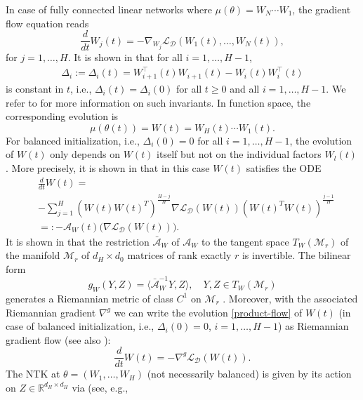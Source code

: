 \documentclass[twoside]{article}
\theoremstyle{definition}
\theoremstyle{remark}
\begin{document}
In  case of fully connected linear networks where $\mu(\theta) = W_N\cdots W_1$, the gradient flow equation reads
\begin{equation}\label{grad-flow-fully-connected}
\frac{d}{dt} W_j(t) = - \nabla_{W_j} \mathcal{L}_{\mathcal{D}}(W_1(t),\hdots,W_N(t)), 
\end{equation}
for $ j=1,\hdots,H$. It is shown in \cite{arora2018optimization} that  for all $i = 1, \ldots, H-1$,
\begin{align}
\label{eq:balancedFullyConnected}
   \Delta_i := \Delta_i(t) = W_{i+1}^\top(t) W_{i+1}(t) - W_{i}(t)W_i^\top(t)
\end{align}
is constant in $t$, i.e., $\Delta_i(t) = \Delta_i(0)$ for all $t \geq 0$ and all $i=1,\hdots,H-1$. We refer to \cite{marcotte2024abide} for more information on such invariants.
In function space, the corresponding evolution is  
\[
\mu(\theta(t)) = W(t) = W_H(t) \cdots W_1(t).
\]
For balanced initialization, i.e., $\Delta_i(0) = 0$ for all $i=1,\hdots,H-1$, the evolution of $W(t)$ only depends on $W(t)$ itself
but not on the individual factors $W_l(t)$. More precisely, it is shown in \cite{arora2018optimization} that in this case $W(t)$ satisfies the ODE
\begin{align}\label{product-flow}
&\frac{d}{dt} W(t) = \nonumber \\
& - \sum_{j=1}^H (W(t)W(t)^T)^{\frac{H-j}{H}} \nabla \mathcal{L}_{\mathcal{D}}(W(t)) (W(t)^TW(t))^{\frac{j-1}{H}} \nonumber \\
&=: -\mathcal{A}_W(t)\big( \nabla \mathcal{L}_{\mathcal{D}}(W(t))\big).
\end{align}
It is shown in \cite{bah2022learning} that the restriction $\bar{\mathcal{A}}_W$ of $\mathcal{A}_W$ to the tangent space $T_W(\mathcal{M}_r)$ of the manifold $\mathcal{M}_r$ of $d_H \times d_0$ matrices of rank exactly $r$ is invertible. The bilinear form
\[
g_W(Y,Z) = \langle \bar{\mathcal{A}}_W^{-1} Y, Z\rangle, \quad Y,Z \in T_W(\mathcal{M}_r)
\]
generates a Riemannian metric of class $C^1$ on $\mathcal{M}_r$ \cite[Propositions 10 and 11]{bah2022learning}. Moreover, with the associated Riemannian gradient $\nabla^g$ we can write the evolution \eqref{product-flow} of $W(t)$ (in case of balanced initialization, i.e., $\Delta_i(0) = 0$, $i=1,\hdots, H-1$) as Riemannian gradient flow (see also \cite{bah2022learning}):
\[
\frac{d}{dt}W(t) = - \nabla^g \mathcal{L}_{\mathcal{D}}(W(t)).
\]
The NTK at $\theta = (W_1,\hdots,W_H)$ (not necessarily balanced) is given by its action on $Z \in \mathbb{R}^{d_H \times d_H}$ via (see, e.g., \cite[Lemma 2]{bah2022learning}
\end{document}
